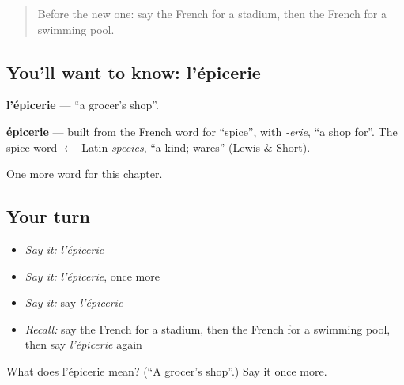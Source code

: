 \label{lesson:FR-C107-epicerie}



\begin{quote}
Before the new one: say the French for a stadium, then the French for a swimming pool.
\end{quote}

\subsection*{You'll want to know: l'épicerie}
\textbf{l'épicerie} — \textquotedblleft{}a grocer's shop\textquotedblright{}.

\begin{cousinweb}
\textbf{épicerie} — built from the French word for \textquotedblleft{}spice\textquotedblright{}, with \emph{-erie}, \textquotedblleft{}a shop for\textquotedblright{}. The spice word $\leftarrow$ Latin \emph{species}, \textquotedblleft{}a kind; wares\textquotedblright{} (Lewis \& Short).
\end{cousinweb}

\begin{grammarlens}[title={What you've built}]
One more word for this chapter.
\end{grammarlens}

\subsection*{Your turn}
\begin{itemize}
\raggedright
  \item \emph{Say it:} \emph{l'épicerie}
  \item \emph{Say it:} \emph{l'épicerie}, once more
  \item \emph{Say it:} say \emph{l'épicerie}
  \item \emph{Recall:} say the French for a stadium, then the French for a swimming pool, then say \emph{l'épicerie} again
\end{itemize}

\begin{tcolorbox}[breakable,colback=teal!4,colframe=teal!35!black,title={Before you move on}]
What does l'épicerie mean? (\textquotedblleft{}A grocer's shop\textquotedblright{}.) Say it once more.
\end{tcolorbox}
